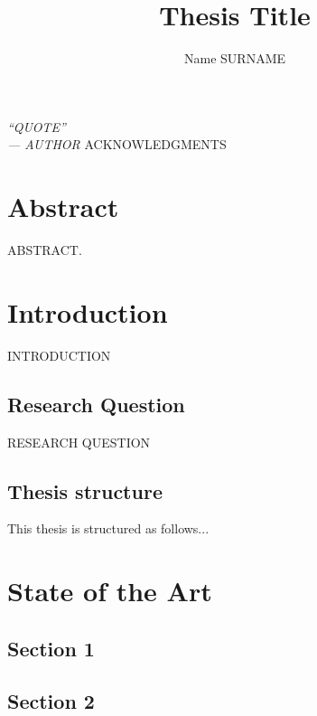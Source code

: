 \documentclass[a4paper,12p, twoside]{report}
\newcommand\blankpage{%
    \null
    \thispagestyle{empty}%
    \addtocounter{page}{-1}%
    \newpage}
\begin{document}
\title{Thesis Title}
\author{Name SURNAME}

\afterpage{\blankpage}
% 
%
\beforepreface
\chapter*{}
        {\hfill \Large {\sl “QUOTE”\\
        — AUTHOR}}
\afterpage{\blankpage}
%
%
ACKNOWLEDGMENTS
\afterpage{\blankpage}

\afterpreface

\chapter*{Abstract}
\label{chap:abstract}
ABSTRACT.
% 
% 
\chapter{Introduction}
\label{chap:introduction}
INTRODUCTION 

\section{Research Question}
\label{sec:research_question}
RESEARCH QUESTION 

\section{Thesis structure}
\label{sec:thesis_structure}
This thesis is structured as follows...
% 
% 
\chapter{State of the Art}
\label{chap:state_of_the_art}

\section{Section 1}
\label{sec:sec_1}

\section{Section 2}
\label{sec:sec_2}
\end{document}
